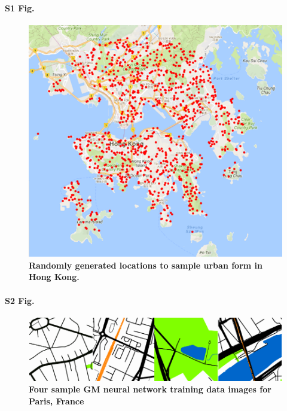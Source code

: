 \documentclass[10pt,letterpaper,hidelinks]{article}
\begin{document}
\paragraph*{S1 Fig.}
\begin{figure}[!htbp] 
\centering    
\includegraphics[scale=0.5]{Images/PlosOne/Fig1.png} 
\caption{\bf Randomly generated locations to sample urban form in Hong Kong.} 
\label{fig:hongkong}  
\end{figure}


\paragraph*{S2 Fig.}
\begin{figure}[!htbp]
    \centering    
\includegraphics[scale=1]{Images/PlosOne/Fig2.png}  
\caption{\bf Four sample GM neural network training data images for Paris, France \cite{GoogleStatic2017}}    
 \label{fig:maps}  
\end{figure} 
\end{document}
